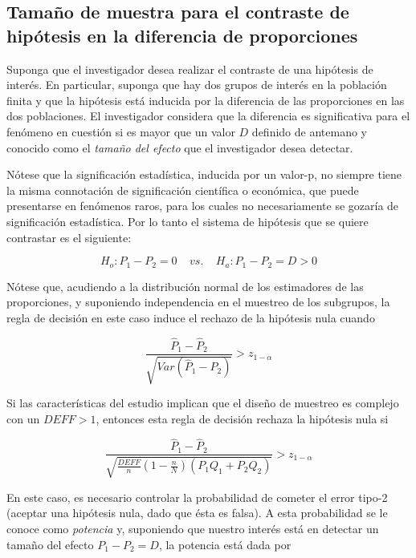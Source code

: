 \documentclass[
  12pt,
  spanish,
]{book}
\begin{document}
\hypertarget{tamauxf1o-de-muestra-para-el-contraste-de-hipuxf3tesis-en-la-diferencia-de-proporciones}{%
\subsection{Tamaño de muestra para el contraste de hipótesis en la diferencia de proporciones}\label{tamauxf1o-de-muestra-para-el-contraste-de-hipuxf3tesis-en-la-diferencia-de-proporciones}}

Suponga que el investigador desea realizar el contraste de una hipótesis de interés. En particular, suponga que hay dos grupos de interés en la población finita y que la hipótesis está inducida por la diferencia de las proporciones en las dos poblaciones. El investigador considera que la diferencia es significativa para el fenómeno en cuestión si es mayor que un valor \(D\) definido de antemano y conocido como el \emph{tamaño del efecto} que el investigador desea detectar.

Nótese que la significación estadística, inducida por un valor-p, no siempre tiene la misma connotación de significación científica o económica, que puede presentarse en fenómenos raros, para los cuales no necesariamente se gozaría de significación estadística. Por lo tanto el sistema de hipótesis que se quiere contrastar es el siguiente:

\[
H_o: P_1-P_2=0 \ \ \ \ \ vs.  \ \ \ \ \ H_a: P_1 -P_2 =D > 0 
\]

Nótese que, acudiendo a la distribución normal de los estimadores de las proporciones, y suponiendo independencia en el muestreo de los subgrupos, la regla de decisión en este caso induce el rechazo de la hipótesis nula cuando

\[
\dfrac{\hat{P}_1-\hat{P}_2}{\sqrt{Var(\hat{P}_1-\hat{P}_2)}} > z_{1-\alpha}
\]

Si las características del estudio implican que el diseño de muestreo es complejo con un \(DEFF > 1\), entonces esta regla de decisión rechaza la hipótesis nula si

\[
\dfrac{\hat{P}_1-\hat{P}_2}{\sqrt{\frac{DEFF}{n}\left(1-\frac{n}{N}\right)(P_1Q_1+P_2Q_2)}} > z_{1-\alpha}
\]

En este caso, es necesario controlar la probabilidad de cometer el error tipo-2 (aceptar una hipótesis nula, dado que ésta es falsa). A esta probabilidad se le conoce como \emph{potencia} y, suponiendo que nuestro interés está en detectar un tamaño del efecto \(P_1 -P_2 =D\), la potencia está dada por
\end{document}
